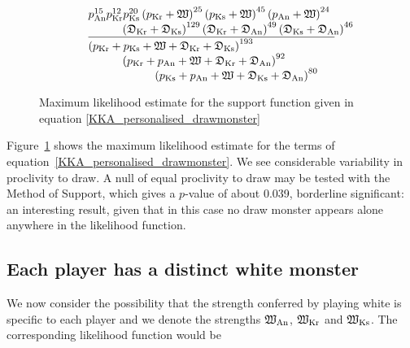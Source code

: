 \documentclass[review]{elsarticle}
\begin{document}
\begin{equation}\label{KKA_personalised_drawmonster}
\frac{
\parbox{3in}{$
p_\mathrm{An}^{15}
p_\mathrm{Kr}^{12}
p_\mathrm{Ks}^{20}
\left(p_\mathrm{Kr} + \white\right)^{25}
\left(p_\mathrm{Ks} + \white\right)^{45} 
\left(p_\mathrm{An} + \white\right)^{24}\\ \rule{10mm}{0mm}
\left(\draw_\mathrm{Kr} + \draw_\mathrm{Ks}\right)^{129}
\left(\draw_\mathrm{Kr} + \draw_\mathrm{An}\right)^{49}
\left(\draw_\mathrm{Ks} + \draw_\mathrm{An}\right)^{46}
$}}{\parbox{3in}{$
\left(p_\mathrm{Kr} + p_\mathrm{Ks} + \white + \draw_\mathrm{Kr} + \draw_\mathrm{Ks}\right)^{193}\\ \rule{10mm}{0mm}
\left(p_\mathrm{Kr} + p_\mathrm{An} + \white + \draw_\mathrm{Kr} + \draw_\mathrm{An}\right)^{92}\\ \rule{20mm}{0mm}
\left(p_\mathrm{Ks} + p_\mathrm{An} + \white + \draw_\mathrm{Ks} + \draw_\mathrm{An}\right)^{80}$}}
\end{equation}


\begin{figure}[t]
\begin{center}
\caption{Maximum likelihood estimate for \label{kka_3draws} the support function given in equation  \ref{KKA_personalised_drawmonster}} 
  \end{center}
\end{figure}


Figure~\ref{kka_3draws} shows the maximum likelihood estimate for the
terms of equation~\ref{KKA_personalised_drawmonster}.  We see
considerable variability in proclivity to draw.  A null of equal
proclivity to draw may be tested with the Method of Support, which
gives a $p$-value of about 0.039, borderline significant: an
interesting result, given that in this case no draw monster appears
alone anywhere in the likelihood function.

\subsection{Each player has a distinct white monster}

We now consider the possibility that the strength conferred by playing
white is specific to each player and we denote the strengths
$\mathfrak{W}_\mathrm{An}$, $\mathfrak{W}_\mathrm{Kr}$ and $\mathfrak{W}_\mathrm{Ks}$.
The corresponding likelihood function would be
\end{document}
